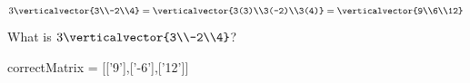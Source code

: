 \documentclass{ximera}
\begin{document}
\begin{question}
  \begin{solution}
    \begin{hint}
      $3\verticalvector{3\\-2\\4} = \verticalvector{3(3)\\3(-2)\\3(4)}  = \verticalvector{9\\6\\12}$
    \end{hint}
    What is $3\verticalvector{3\\-2\\4}$?
    \begin{matrix-answer}[name=v]
      correctMatrix = [['9'],['-6'],['12']]
    \end{matrix-answer}
  \end{solution}
\end{question}
\end{document}
